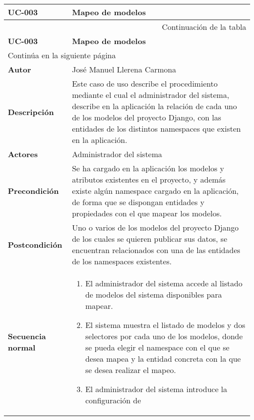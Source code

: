 \begin{center}
\begin{longtable}{||p{3.4cm}|p{12cm}||}
 \hline \hline \bf UC-003 &  \bf Mapeo de modelos \\
\hline
\endfirsthead
\hline \multicolumn{2}{|r|}{{Continuación de la tabla}} \\ \hline
 \hline \bf UC-003 &  \bf Mapeo de modelos \\
\hline
\endhead
\hline \multicolumn{2}{|l|}{{Continúa en la siguiente página}} \\ \hline
\endfoot
\endlastfoot
 \hline \bf Autor & José Manuel Llerena Carmona \\
 \hline \bf Descripción & Este caso de uso describe el procedimiento mediante
             el cual el administrador del sistema, describe en la aplicación la
             relación de cada uno de los modelos del proyecto Django, con las
             entidades de los distintos namespaces que existen en la
             aplicación.\\
 \hline \bf Actores & Administrador del sistema\\
 \hline \bf Precondición & Se ha cargado en la aplicación los modelos y
             atributos existentes en el proyecto, y además existe algún namespace
             cargado en la aplicación, de forma que se dispongan entidades y
             propiedades con el que mapear los modelos.\\
 \hline \bf Postcondición & Uno o varios de los modelos del proyecto Django de
             los cuales se quieren publicar sus datos, se encuentran
             relacionados con una de las entidades de los namespaces
             existentes.\\
 \hline \bf Secuencia normal & 
             \begin{enumerate}
                \item El administrador del sistema accede al listado de
                       modelos del sistema disponibles para mapear.
                \item El sistema muestra el listado de modelos y dos selectores
                       por cada uno de los modelos, donde se pueda elegir el
                       namespace con el que se desea mapea y la entidad concreta
                       con la que se desea realizar el mapeo.
                \item El administrador del sistema introduce la configuración de

\end{enumerate}
\end{longtable}
\end{center}
